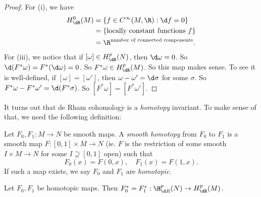 \documentclass[a4paper]{article}
\begin{document}
\begin{proof}
  For (i), we have
  \begin{align*}
    H_{\dR}^0(M) &= \{f \in C^\infty(M, \R): \d f = 0\} \\
    &= \{\text{locally constant functions $f$}\}\\
    &= \R^{\text{number of connected components}}.
  \end{align*}
  For (iii), we notice that if $[\omega] \in H^p_{\dR}(N)$, then $\d \omega = 0$. So $\d (F^* \omega) = F^*(\d \omega) = 0$. So $F^* \omega \in H^p_\dR(M)$. So this map makes sense. To see it is well-defined, if $[\omega] = [\omega']$, then $\omega - \omega' = \d \sigma$ for some $\sigma$. So $F^* \omega - F^* \omega' = \d (F^* \sigma)$. So $[F^* \omega] = [F^* \omega']$.
\end{proof}

It turns out that de Rham cohomology is a \emph{homotopy} invariant. To make sense of that, we need the following definition:
\begin{defi}
  Let $F_0, F_1: M \to N$ be smooth maps. A \emph{smooth homotopy} from $F_0$ to $F_1$ is a smooth map $F: [0, 1] \times M \to N$ (ie. $F$ is the restriction of some smooth $I \times M \to N$ for some $I \supseteq [0, 1]$ open) such that
  \[
    F_0(x) = F(0, x),\quad F_1(x) = F(1, x).
  \]
  If such a map exists, we say $F_0$ and $F_1$ are \emph{homotopic}.
\end{defi}

\begin{thm}
  Let $F_0, F_1$ be homotopic maps. Then $F_0^* = F_1^*: \H^p_{\d R}(N) \to H_{\dR}^p(M)$.
\end{thm}
\end{document}
